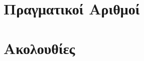 






\everymath{\displaystyle}

\setlength{\parindent}{0pt}

\pagestyle{vangelis}

\chapter{Πραγματικοί Αριθμοί}


\chapter{Ακολουθίες}





